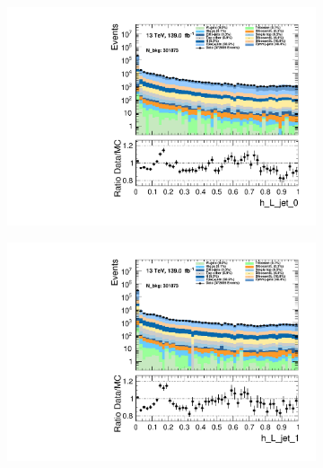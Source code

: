 \begin{figure}
    \centering
    \begin{subfigure}{.49\textwidth}
        \includegraphics[width=\textwidth]{Figures/MC_Data_comp/h_L_jet_0.pdf}
        \caption{}
        \label{fig:et}
    \end{subfigure}
    \hfill
    \begin{subfigure}{.49\textwidth}
        \includegraphics[width=\textwidth]{Figures/MC_Data_comp/h_L_jet_1.pdf}
        \caption{ }
        \label{fig:flcp}
    \end{subfigure}
    \hfill 
    \begin{subfigure}{.49\textwidth}

\end{subfigure}
\end{figure}
